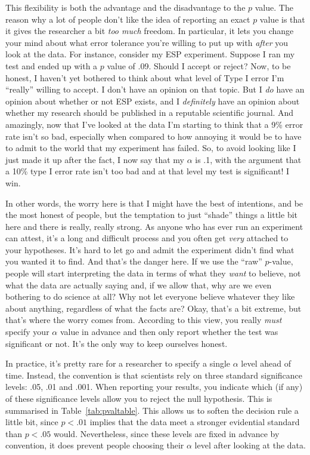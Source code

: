 This flexibility is both the advantage and the disadvantage to the $p$ value. The reason why a lot of people don't like the idea of reporting an exact $p$ value is that it gives the researcher a bit {\it too much} freedom. In particular, it lets you change your mind about what error tolerance you're willing to put up with {\it after} you look at the data. For instance, consider my ESP experiment. Suppose I ran my test and ended up with a $p$ value of .09. Should I accept or reject?  Now, to be honest, I haven't yet bothered to think about what level of Type I error I'm ``really'' willing to accept. I don't have an opinion on that topic. But I {\it do} have an opinion about whether or not ESP exists, and I {\it definitely} have an opinion about whether my research should be published in a reputable scientific journal. And amazingly, now that I've looked at the data I'm starting to think that a 9\% error rate isn't so bad, especially when compared to how annoying it would be to have to admit to the world that my experiment has failed. So, to avoid looking like I just made it up after the fact, I now say that my $\alpha$ is .1, with the argument that a 10\% type I error rate isn't too bad and at that level my test is significant! I win.

In other words, the worry here is that I might have the best of intentions, and be the most honest of people, but the temptation to just ``shade'' things a little bit here and there is really, really strong. As anyone who has ever run an experiment can attest, it's a long and difficult process and you often get {\it very} attached to your hypotheses. It's hard to let go and admit the experiment didn't find what you wanted it to find. And that's the danger here. If we use the ``raw'' $p$-value, people will start interpreting the data in terms of what they {\it want} to believe, not what the data are actually saying and, if we allow that, why are we even bothering to do science at all? Why not let everyone believe whatever they like about anything, regardless of what the facts are? Okay, that's a bit extreme, but that's where the worry comes from. According to this view, you really {\it must} specify your $\alpha$ value in advance and then only report whether the test was significant or not. It's the only way to keep ourselves honest. 



In practice, it's pretty rare for a researcher to specify a single $\alpha$ level ahead of time. Instead, the convention is that scientists rely on three standard significance levels: .05, .01 and .001. When reporting your results, you indicate which (if any) of these significance levels allow you to reject the null hypothesis. This is summarised in Table~\ref{tab:pvaltable}. This allows us to soften the decision rule a little bit, since $p<.01$ implies that the data meet a stronger evidential standard than $p<.05$ would. Nevertheless, since these levels are fixed in advance by convention, it does prevent people choosing their $\alpha$ level after looking at the data. 

